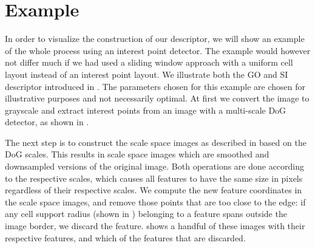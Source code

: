 \documentclass[thesis.tex]{subfiles}
\begin{document}
\section{Example} \label{sec:proposedDescriptorExample}
%
In order to visualize the construction of our descriptor, we will show an example of the whole process using an interest point detector. The example would however not differ much if we had used a sliding window approach with a uniform cell layout instead of an interest point layout. We illustrate both the GO and SI descriptor introduced in . The parameters chosen for this example are chosen for illustrative purposes and not necessarily optimal. At first we convert the image to grayscale and extract interest points from an image with a multi-scale DoG detector, as shown in .

The next step is to construct the scale space images as described in  based on the DoG scales. This results in scale space images which are smoothed and downsampled versions of the original image. Both operations are done according to the respective scales, which causes all features to have the same size in pixels regardless of their respective scales. We compute the new feature coordinates in the scale space images, and remove those points that are too close to the edge: if any cell support radius (shown in ) belonging to a feature spans outside the image border, we discard the feature.  shows a handful of these images with their respective features, and which of the features that are discarded.
\end{document}
